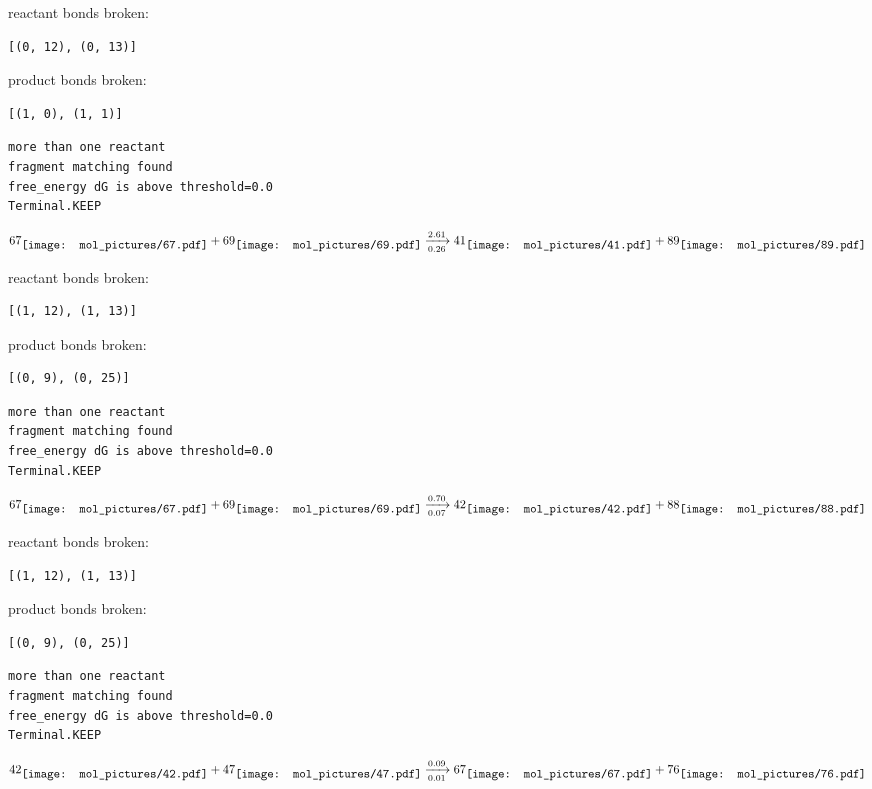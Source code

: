 \documentclass{article}
\begin{document}
reactant bonds broken:\begin{verbatim}
[(0, 12), (0, 13)]
\end{verbatim}
product bonds broken:\begin{verbatim}
[(1, 0), (1, 1)]
\end{verbatim}




\vspace{1cm}
\begin{verbatim}
more than one reactant
fragment matching found
free_energy dG is above threshold=0.0
Terminal.KEEP
\end{verbatim}
$$
67
\raisebox{-.5\height}{\texttt{[image: mol\_pictures/67.pdf]}}
+
69
\raisebox{-.5\height}{\texttt{[image: mol\_pictures/69.pdf]}}
\xrightarrow[0.26]{2.61}
41
\raisebox{-.5\height}{\texttt{[image: mol\_pictures/41.pdf]}}
+
89
\raisebox{-.5\height}{\texttt{[image: mol\_pictures/89.pdf]}}
$$


reactant bonds broken:\begin{verbatim}
[(1, 12), (1, 13)]
\end{verbatim}
product bonds broken:\begin{verbatim}
[(0, 9), (0, 25)]
\end{verbatim}




\vspace{1cm}
\begin{verbatim}
more than one reactant
fragment matching found
free_energy dG is above threshold=0.0
Terminal.KEEP
\end{verbatim}
$$
67
\raisebox{-.5\height}{\texttt{[image: mol\_pictures/67.pdf]}}
+
69
\raisebox{-.5\height}{\texttt{[image: mol\_pictures/69.pdf]}}
\xrightarrow[0.07]{0.70}
42
\raisebox{-.5\height}{\texttt{[image: mol\_pictures/42.pdf]}}
+
88
\raisebox{-.5\height}{\texttt{[image: mol\_pictures/88.pdf]}}
$$


reactant bonds broken:\begin{verbatim}
[(1, 12), (1, 13)]
\end{verbatim}
product bonds broken:\begin{verbatim}
[(0, 9), (0, 25)]
\end{verbatim}




\vspace{1cm}
\begin{verbatim}
more than one reactant
fragment matching found
free_energy dG is above threshold=0.0
Terminal.KEEP
\end{verbatim}
$$
42
\raisebox{-.5\height}{\texttt{[image: mol\_pictures/42.pdf]}}
+
47
\raisebox{-.5\height}{\texttt{[image: mol\_pictures/47.pdf]}}
\xrightarrow[0.01]{0.09}
67
\raisebox{-.5\height}{\texttt{[image: mol\_pictures/67.pdf]}}
+
76
\raisebox{-.5\height}{\texttt{[image: mol\_pictures/76.pdf]}}
$$
\end{document}

